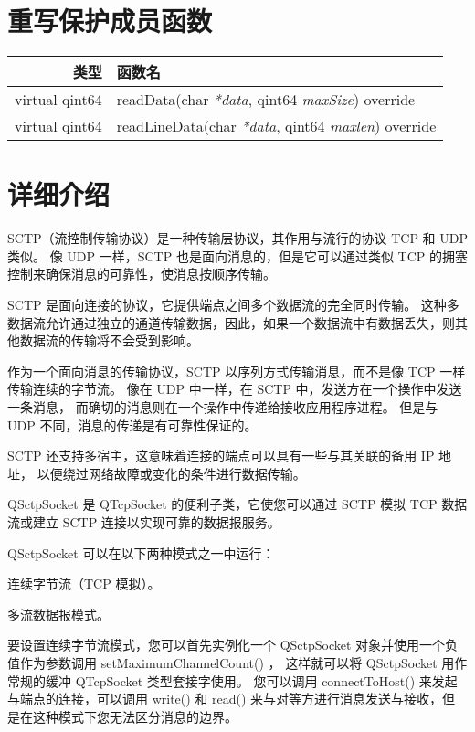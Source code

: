\section{重写保护成员函数}

\begin{tabular}{|r|l|}
	\hline 
	类型	& 函数名 \\ 
	\hline
	virtual qint64	& readData(char \emph{*data}, qint64 \emph{maxSize}) override \\ 
	\hline
    virtual qint64	& readLineData(char \emph{*data}, qint64 \emph{maxlen}) override \\ 
	\hline
\end{tabular}

\section{详细介绍}

SCTP（流控制传输协议）是一种传输层协议，其作用与流行的协议 TCP 和 UDP 类似。 
像 UDP 一样，SCTP 也是面向消息的，但是它可以通过类似 TCP 的拥塞控制来确保消息的可靠性，使消息按顺序传输。

SCTP 是面向连接的协议，它提供端点之间多个数据流的完全同时传输。 
这种多数据流允许通过独立的通道传输数据，因此，如果一个数据流中有数据丢失，则其他数据流的传输将不会受到影响。

作为一个面向消息的传输协议，SCTP 以序列方式传输消息，而不是像 TCP 一样传输连续的字节流。 
像在 UDP 中一样，在 SCTP 中，发送方在一个操作中发送一条消息，
而确切的消息则在一个操作中传递给接收应用程序进程。
 但是与 UDP 不同，消息的传递是有可靠性保证的。

SCTP 还支持多宿主，这意味着连接的端点可以具有一些与其关联的备用 IP 地址，
以便绕过网络故障或变化的条件进行数据传输。

QSctpSocket 是 QTcpSocket 的便利子类，它使您可以通过 SCTP 模拟 TCP 数据流或建立 SCTP 连接以实现可靠的数据报服务。

QSctpSocket 可以在以下两种模式之一中运行：

\begin{compactitem}
\item 连续字节流（TCP 模拟）。
\item 多流数据报模式。
\end{compactitem}

要设置连续字节流模式，您可以首先实例化一个 QSctpSocket 对象并使用一个负值作为参数调用 setMaximumChannelCount() ，
这样就可以将 QSctpSocket 用作常规的缓冲 QTcpSocket 类型套接字使用。 
您可以调用 connectToHost() 来发起与端点的连接，可以调用 write() 和 read() 来与对等方进行消息发送与接收，但是在这种模式下您无法区分消息的边界。

